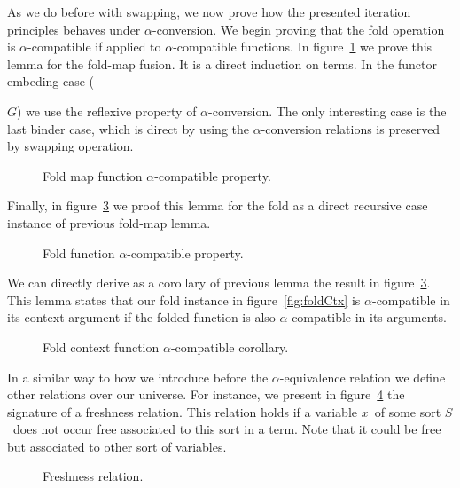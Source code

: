 \documentclass{book}
\newcommand{\alp}{\ensuremath{\alpha}}
\begin{document}
As we do before with swapping, we now prove how the presented iteration principles behaves under \alp-conversion. We begin proving that the fold operation is \alp-compatible if applied to \alp-compatible functions. In figure~\ref{fig:foldmapalphaf} we prove this lemma for the fold-map fusion. It is a direct induction on terms. In the functor embeding case ({ $G$) we use the reflexive property of \alp-conversion. The only interesting case is the last binder case, which is direct by using the \alp-conversion relations is preserved by swapping operation. 

\begin{figure}[h!]
  \caption{Fold map function \alp-compatible property.}
\label{fig:foldmapalphaf}
\end{figure}

Finally, in figure~\ref{fig:foldalphaf} we proof this lemma for the fold as a direct recursive case instance of previous fold-map lemma.

\begin{figure}[h!]
  \caption{Fold function \alp-compatible property.}
\label{fig:foldalphaf}
\end{figure}

We can directly derive as a corollary of previous lemma the result in figure~\ref{fig:foldalphaf}. This lemma states that our fold instance in figure~\ref{fig:foldCtx} is \alp-compatible in its context argument if the folded function is also \alp-compatible in its arguments.

\begin{figure}[h!]
  \caption{Fold context function \alp-compatible corollary.}
\label{fig:foldalphaf}
\end{figure}

In a similar way to how we introduce before the \alp-equivalence relation we define other relations over our universe. For instance, we present in figure~\ref{fig:freshness} the signature of a freshness relation. This relation holds if a variable $x$\ of some sort $S$\ does not occur free associated to this sort in a term. Note that it could be free but associated to other sort of variables.

\begin{figure}[h]
  \caption{Freshness relation.}
\label{fig:freshness}
\end{figure}

}
\end{document}
